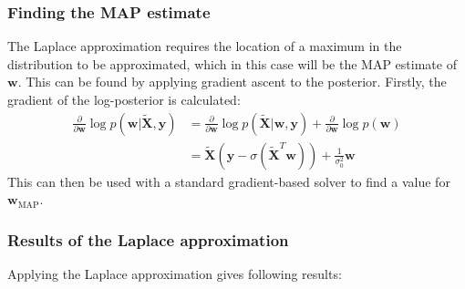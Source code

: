 \documentclass[a4paper]{article}
\begin{document}
    \subsubsection{Finding the MAP estimate}
    The Laplace approximation requires the location of a maximum in the distribution to be approximated, which in this case will be the MAP estimate of $\bm{w}$.
    This can be found by applying gradient ascent to the posterior.
    Firstly, the gradient of the log-posterior is calculated:
    \begin{align}
        \frac{\partial}{\partial \bm{w}} \log p(\bm{w} | \tilde{\bm{X}}, \bm{y}) &= \frac{\partial}{\partial \bm{w}} \log p(\tilde{\bm{X}} | \bm{w} , \bm{y}) + \frac{\partial}{\partial \bm{w}} \log p(\bm{w}) \nonumber \\
        &= \tilde{\bm{X}} (\textbf{y} - \sigma(\tilde{\bm{X}}^T \bm{w})) + \frac{1}{\sigma_0^2} \bm{w}
    \end{align}
    This can then be used with a standard gradient-based solver to find a value for $\bm{w}_\text{MAP}$.
    \subsubsection{Results of the Laplace approximation}
    Applying the Laplace approximation gives following results:
\end{document}
